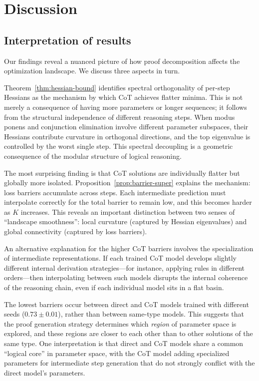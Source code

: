 \section{Discussion}\label{sec:discussion}

\subsection{Interpretation of results}\label{subsec:interpretation}

Our findings reveal a nuanced picture of how proof decomposition affects the
optimization landscape. We discuss three aspects in turn.

Theorem~\ref{thm:hessian-bound} identifies spectral orthogonality of per-step
Hessians as the mechanism by which CoT achieves flatter minima. This is not
merely a consequence of having more parameters or longer sequences; it follows
from the structural independence of different reasoning steps. When modus ponens
and conjunction elimination involve different parameter subspaces, their
Hessians contribute curvature in orthogonal directions, and the top eigenvalue
is controlled by the worst single step. This spectral decoupling is a geometric
consequence of the modular structure of logical reasoning.

The most surprising finding is that CoT solutions are individually flatter but
globally more isolated. Proposition~\ref{prop:barrier-super} explains the
mechanism: loss barriers accumulate across steps. Each intermediate prediction
must interpolate correctly for the total barrier to remain low, and this
becomes harder as $K$ increases. This reveals an important distinction between
two senses of ``landscape smoothness'': local curvature (captured by Hessian
eigenvalues) and global connectivity (captured by loss barriers).

An alternative explanation for the higher CoT barriers involves the
specialization of intermediate representations. If each trained CoT model
develops slightly different internal derivation strategies---for instance,
applying rules in different orders---then interpolating between such models
disrupts the internal coherence of the reasoning chain, even if each
individual model sits in a flat basin.

The lowest barriers occur between direct and CoT models trained with different
seeds ($0.73 \pm 0.01$), rather than between same-type models. This suggests
that the proof generation strategy determines which \emph{region} of parameter
space is explored, and these regions are closer to each other than to other
solutions of the same type. One interpretation is that direct and CoT models
share a common ``logical core'' in parameter space, with the CoT model adding
specialized parameters for intermediate step generation that do not strongly
conflict with the direct model's parameters.

